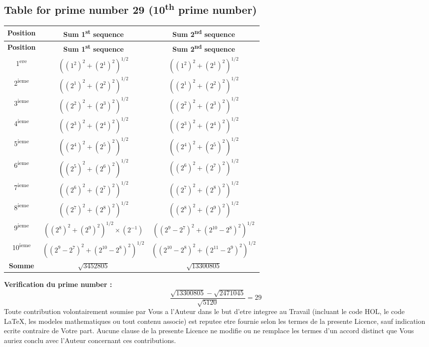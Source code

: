 \documentclass[a4paper,11pt]{article}
\begin{document}
\subsection{Table for prime number 29 (10\textsuperscript{th} prime number)}

\begin{center}
\begin{longtable}{|c|c|c|}
\hline
\textbf{Position} & \textbf{Sum 1\textsuperscript{st} sequence} & \textbf{Sum 2\textsuperscript{nd} sequence} \\
\hline
\endfirsthead
\hline
\textbf{Position} & \textbf{Sum 1\textsuperscript{st} sequence} & \textbf{Sum 2\textsuperscript{nd} sequence} \\
\hline
\endhead
1\textsuperscript{ere} & $((1^2)^2 + (2^1)^2)^{1/2}$ & $((1^2)^2 + (2^1)^2)^{1/2}$ \\
\hline
2\textsuperscript{ieme} & $((2^1)^2 + (2^2)^2)^{1/2}$ & $((2^1)^2 + (2^2)^2)^{1/2}$ \\
\hline
3\textsuperscript{ieme} & $((2^2)^2 + (2^3)^2)^{1/2}$ & $((2^2)^2 + (2^3)^2)^{1/2}$ \\
\hline
4\textsuperscript{ieme} & $((2^3)^2 + (2^4)^2)^{1/2}$ & $((2^3)^2 + (2^4)^2)^{1/2}$ \\
\hline
5\textsuperscript{ieme} & $((2^4)^2 + (2^5)^2)^{1/2}$ & $((2^4)^2 + (2^5)^2)^{1/2}$ \\
\hline
6\textsuperscript{ieme} & $((2^5)^2 + (2^6)^2)^{1/2}$ & $((2^6)^2 + (2^7)^2)^{1/2}$ \\
\hline
7\textsuperscript{ieme} & $((2^6)^2 + (2^7)^2)^{1/2}$ & $((2^7)^2 + (2^8)^2)^{1/2}$ \\
\hline
8\textsuperscript{ieme} & $((2^7)^2 + (2^8)^2)^{1/2}$ & $((2^8)^2 + (2^9)^2)^{1/2}$ \\
\hline
9\textsuperscript{ieme} & $((2^8)^2 + (2^9)^2)^{1/2} \times (2^{-1})$ & $((2^9-2^7)^2 + (2^{10}-2^8)^2)^{1/2}$ \\
\hline
10\textsuperscript{ieme} & $((2^9-2^7)^2 + (2^{10}-2^8)^2)^{1/2}$ & $((2^{10}-2^8)^2 + (2^{11}-2^9)^2)^{1/2}$ \\
\hline
\textbf{Somme} & $\sqrt{3452805}$ & $\sqrt{13300805}$ \\
\hline
\end{longtable}
\end{center}

\textbf{Verification du prime number :}
\[
\frac{\sqrt{13300805} - \sqrt{2471045}}{\sqrt{5120}} = 29
\]
Toute contribution volontairement soumise par Vous a l'Auteur dans le but
d'etre integree au Travail (incluant le code HOL, le code LaTeX, les
modeles mathematiques ou tout contenu associe) est reputee etre fournie
selon les termes de la presente Licence, sauf indication ecrite contraire
de Votre part. Aucune clause de la presente Licence ne modifie ou ne
remplace les termes d'un accord distinct que Vous auriez conclu avec
l'Auteur concernant ces contributions.
\end{document}
